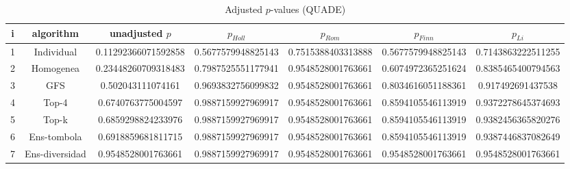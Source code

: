 \documentclass[a4paper,10pt]{article}
\begin{document}
\begin{landscape}
\begin{table}[!htp]
\centering\scriptsize
\caption{Adjusted $p$-values (QUADE)}
\begin{tabular}{ccccccc}
i&algorithm&unadjusted $p$&$p_{Holl}$&$p_{Rom}$&$p_{Finn}$&$p_{Li}$\\
\hline
1&Individual&0.11292366071592858&0.5677579948825143&0.7515388403313888&0.5677579948825143&0.7143863222511255\\
2&Homogenea&0.23448260709318483&0.7987525551177941&0.9548528001763661&0.6074972365251624&0.8385465400794563\\
3&GFS&0.502043111074161&0.9693832756099832&0.9548528001763661&0.8034616051188361&0.917492691437538\\
4&Top-4&0.6740763775004597&0.9887159927969917&0.9548528001763661&0.8594105546113919&0.9372278645374693\\
5&Top-k&0.6859298824233976&0.9887159927969917&0.9548528001763661&0.8594105546113919&0.9382456365820276\\
6&Ens-tombola&0.6918859681811715&0.9887159927969917&0.9548528001763661&0.8594105546113919&0.9387446837082649\\
7&Ens-diversidad&0.9548528001763661&0.9887159927969917&0.9548528001763661&0.9548528001763661&0.9548528001763661\\
\hline
\end{tabular}
\end{table}

\end{landscape}
\end{document}
